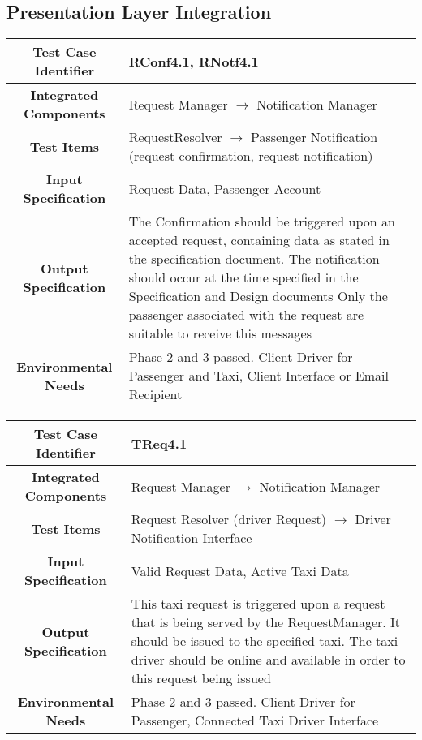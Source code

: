 \documentclass[11pt, a4paper,titlepage]{article}
\begin{document}
	\subsection{Presentation Layer Integration}
			\begin{tabularx}{\textwidth}{| c|X|}
				\hline \textbf{Test Case Identifier} & RConf4.1, RNotf4.1 \\
				\hline \textbf{Integrated Components} & Request Manager $\rightarrow $ Notification Manager \\
				\hline \textbf{Test Items} & RequestResolver $\rightarrow $ Passenger Notification (request confirmation, request notification) \\
				\hline \textbf{Input Specification} & Request Data, Passenger Account \\
				\hline \textbf{Output Specification} & The Confirmation should be triggered upon an accepted request, containing data as stated in the specification document. \newline
				The notification should occur at the time specified in the Specification and Design documents \newline
				Only the passenger associated with the request are suitable to receive this messages 
				\\
				\hline \textbf{Environmental Needs} & Phase 2 and 3 passed. Client Driver for Passenger and Taxi, Client Interface or Email Recipient \\
				\hline
			\end{tabularx}
			\newline
			
			\begin{tabularx}{\textwidth}{| c|X|}
				\hline \textbf{Test Case Identifier} & TReq4.1 \\
				\hline \textbf{Integrated Components} &  Request Manager $\rightarrow $ Notification Manager \\
				\hline \textbf{Test Items} & Request Resolver (driver Request) $\rightarrow $ Driver Notification Interface \\
				\hline \textbf{Input Specification} & Valid Request Data, Active Taxi Data \\
				\hline \textbf{Output Specification} & This taxi request is triggered upon a request that is being served by the RequestManager. It should be issued to the specified taxi. \newline
				The taxi driver should be online and available in order to this request being issued \\
				\hline \textbf{Environmental Needs} & Phase 2 and 3 passed. Client Driver for Passenger, Connected Taxi Driver Interface \\
				\hline
			\end{tabularx}
			\newline
			
\end{document}
